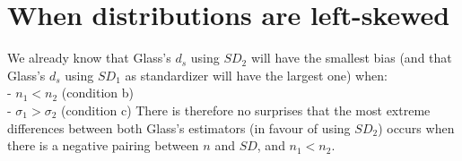 \documentclass[
  man]{apa6}
\begin{document}
\hypertarget{when-distributions-are-left-skewed}{%
\section{When distributions are left-skewed}\label{when-distributions-are-left-skewed}}

We already know that Glass's \(d_s\) using \(SD_2\) will have the smallest bias (and that Glass's \(d_s\) using \(SD_1\) as standardizer will have the largest one) when:\\
- \(n_1 < n_2\) (condition b)\\
- \(\sigma_1 > \sigma_2\) (condition c)
There is therefore no surprises that the most extreme differences between both Glass's estimators (in favour of using \(SD_2\)) occurs when there is a negative pairing between \(n\) and \(SD\), and \(n_1 < n_2\).
\end{document}
